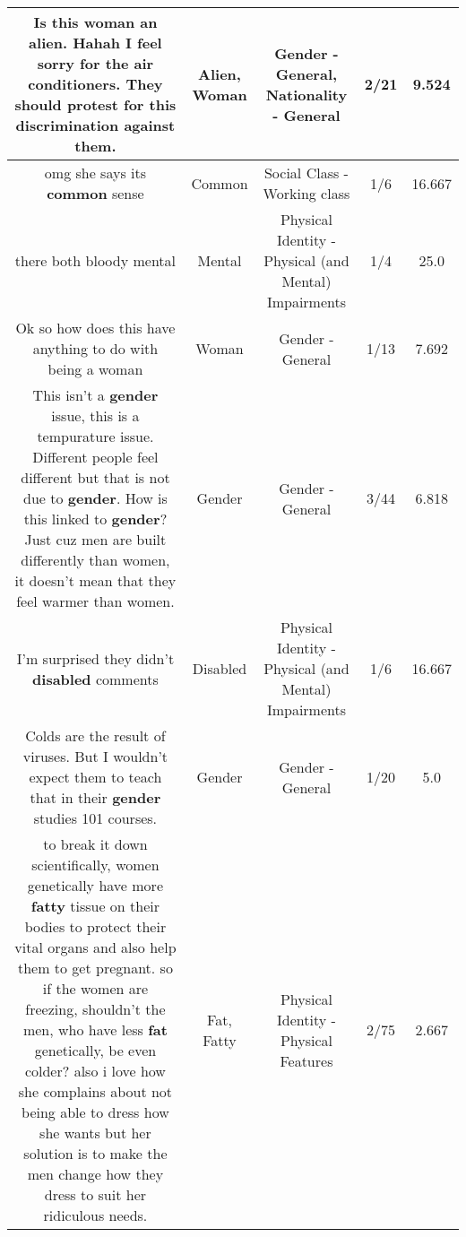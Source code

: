 \documentclass[11pt]{article}
\newlength\mylength
\begin{document}
\begin{center}
\begin{longtable}{|C{.65\mylength}|C{.30\mylength}|C{.12\mylength}|C{.12\mylength}|C{.12\mylength}|}
  \small Is this \textbf{woman} an \textbf{alien}. Hahah I feel sorry for the air conditioners. They should protest for this discrimination against them.\normalsize   & Alien, Woman & Gender - General, Nationality - General & 2/21 & 9.524 \\  \hline
  \small omg she says its \textbf{common} sense\normalsize   & Common & Social Class - Working class & 1/6 & 16.667 \\  \hline
  \small there both bloody mental\normalsize   & Mental & Physical Identity - Physical (and Mental) Impairments & 1/4 & 25.0 \\  \hline
  \small Ok so how does this have anything to do with being a woman\normalsize   & Woman & Gender - General & 1/13 & 7.692 \\  \hline
  \small This isn't a \textbf{gender} issue, this is a tempurature issue. Different people feel different but that is not due to \textbf{gender}. How is this linked to \textbf{gender}? Just cuz men are built differently than women, it doesn't mean that they feel warmer than women.\normalsize   & Gender & Gender - General & 3/44 & 6.818 \\  \hline
  \small I'm surprised they didn't \textbf{disabled} comments\normalsize   & Disabled & Physical Identity - Physical (and Mental) Impairments & 1/6 & 16.667 \\  \hline
  \small Colds are the result of viruses. But I wouldn't expect them to teach that in their \textbf{gender} studies 101 courses.\normalsize   & Gender & Gender - General & 1/20 & 5.0 \\  \hline
  \small to break it down scientifically, women genetically have more \textbf{fatty} tissue on their bodies to protect their vital organs and also help them to get pregnant. so if the women are freezing, shouldn't the men, who have less \textbf{fat} genetically, be even colder? also i love how she complains about not being able to dress how she wants but her solution is to make the men change how they dress to suit her ridiculous needs.\normalsize   & Fat, Fatty & Physical Identity - Physical Features & 2/75 & 2.667 \\  \hline

\end{longtable}
\end{center}
\end{document}
